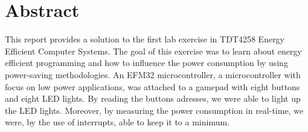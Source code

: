 \section{Abstract}

This report provides a solution to the first lab exercise in TDT4258 Energy Efficient Computer Systems. The goal of this exercise was to learn about energy efficient programming and how to influence the power consumption by using power-saving methodologies. An EFM32 microcontroller, a microcontroller with focus on low power applications, was attached to a gamepad with eight buttons and eight LED lights. By reading the buttons adresses, we were able to light up the LED lights. Moreover, by measuring the power consumption in real-time, we were, by the use of interrupts, able to keep it to a minimum.

